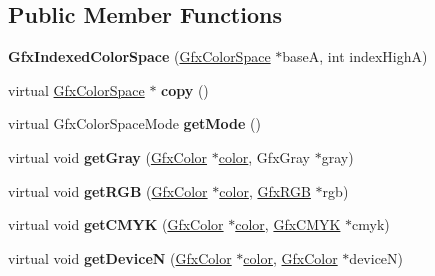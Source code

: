 \subsection*{Public Member Functions}
\begin{DoxyCompactItemize}
\item 
\mbox{\label{class_gfx_indexed_color_space_ab526c15a6dc12959057fd3147c1e4e7b}} 
{\bfseries Gfx\+Indexed\+Color\+Space} (\hyperlink{class_gfx_color_space}{Gfx\+Color\+Space} $\ast$baseA, int index\+HighA)
\item 
\mbox{\label{class_gfx_indexed_color_space_a0c253c6edbb4829a7c677badcd01692e}} 
virtual \hyperlink{class_gfx_color_space}{Gfx\+Color\+Space} $\ast$ {\bfseries copy} ()
\item 
\mbox{\label{class_gfx_indexed_color_space_a697375769129862cd9b3a49bb1d21842}} 
virtual Gfx\+Color\+Space\+Mode {\bfseries get\+Mode} ()
\item 
\mbox{\label{class_gfx_indexed_color_space_aadf56a1d6818a4cc7a4e9615cc2c8a2b}} 
virtual void {\bfseries get\+Gray} (\hyperlink{struct_gfx_color}{Gfx\+Color} $\ast$\hyperlink{structcolor}{color}, Gfx\+Gray $\ast$gray)
\item 
\mbox{\label{class_gfx_indexed_color_space_a1b10ad710475142cb83d96cccaed3d59}} 
virtual void {\bfseries get\+R\+GB} (\hyperlink{struct_gfx_color}{Gfx\+Color} $\ast$\hyperlink{structcolor}{color}, \hyperlink{struct_gfx_r_g_b}{Gfx\+R\+GB} $\ast$rgb)
\item 
\mbox{\label{class_gfx_indexed_color_space_afa87c76031f695d13d06989d5f1a0bef}} 
virtual void {\bfseries get\+C\+M\+YK} (\hyperlink{struct_gfx_color}{Gfx\+Color} $\ast$\hyperlink{structcolor}{color}, \hyperlink{struct_gfx_c_m_y_k}{Gfx\+C\+M\+YK} $\ast$cmyk)
\item 
\mbox{\label{class_gfx_indexed_color_space_ac4b0c111dbe3eddcf235496857eecfcd}} 
virtual void {\bfseries get\+DeviceN} (\hyperlink{struct_gfx_color}{Gfx\+Color} $\ast$\hyperlink{structcolor}{color}, \hyperlink{struct_gfx_color}{Gfx\+Color} $\ast$deviceN)

\end{DoxyCompactItemize}
